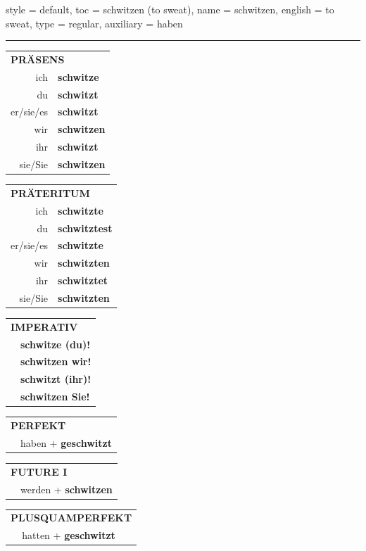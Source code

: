 \begin{verbentry}{
  style = {default},
  toc = {schwitzen (to sweat)},
  name = {schwitzen},
  english = {to sweat},
  type = {regular},
  auxiliary = {haben}
}


\vspace{5pt}
\hrule
\vspace{5pt}

\begin{tabular}{rl}
\multicolumn{2}{l}{\textbf{PRÄSENS}}\\
ich & \textbf{schwitze}\\
du & \textbf{schwitzt}\\
er/sie/es & \textbf{schwitzt}\\
wir & \textbf{schwitzen}\\
ihr & \textbf{schwitzt}\\
sie/Sie & \textbf{schwitzen}\\
\end{tabular}
\hfill
\begin{tabular}{rl}
\multicolumn{2}{l}{\textbf{PRÄTERITUM}}\\
ich & \textbf{schwitzte}\\
du & \textbf{schwitztest}\\
er/sie/es & \textbf{schwitzte}\\
wir & \textbf{schwitzten}\\
ihr & \textbf{schwitztet}\\
sie/Sie & \textbf{schwitzten}\\
\end{tabular}
\hfill
\begin{tabular}{rl}
\multicolumn{2}{l}{\textbf{IMPERATIV}}\\
& \textbf{schwitze (du)!}\\
& \textbf{schwitzen wir!}\\
& \textbf{schwitzt (ihr)!}\\
& \textbf{schwitzen Sie!}\\
\end{tabular}

\vspace{10pt}

\begin{tabular}{rl}
\multicolumn{2}{l}{\textbf{PERFEKT}}\\
& haben + \textbf{geschwitzt}\\
\end{tabular}
\hfill
\begin{tabular}{rl}
\multicolumn{2}{l}{\textbf{FUTURE I}}\\
& werden + \textbf{schwitzen}\\
\end{tabular}
\hfill
\begin{tabular}{rl}
\multicolumn{2}{l}{\textbf{PLUSQUAMPERFEKT}}\\
& hatten + \textbf{geschwitzt}\\
\end{tabular}


\end{verbentry}
